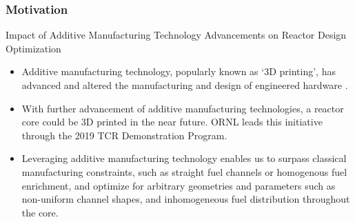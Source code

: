 \begin{frame}
    \frametitle{Motivation}
    \begin{block}{Impact of Additive Manufacturing Technology Advancements on 
        Reactor Design Optimization}
        \begin{itemize}
            \item Additive manufacturing technology, popularly known as `3D printing', 
            has advanced and altered the manufacturing and design of engineered hardware
            \cite{simpson_considerations_2019}. 
            \item With further advancement of additive manufacturing technologies, a reactor 
            core could be 3D printed in the near future. 
            \acrlong{ORNL} leads this initiative through the 2019 \acrlong{TCR} Demonstration 
            Program. 
            \item Leveraging additive manufacturing technology enables us to surpass classical 
            manufacturing constraints, such as straight fuel channels or homogenous fuel 
            enrichment, and optimize for arbitrary geometries and parameters 
            such as non-uniform channel shapes, and inhomogeneous fuel distribution 
            throughout the core. 
          \end{itemize}
    \end{block}
  \end{frame}


